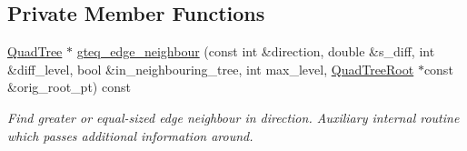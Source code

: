 \subsection*{Private Member Functions}
\begin{DoxyCompactItemize}
\item 
\hyperlink{classoomph_1_1QuadTree}{Quad\+Tree} $\ast$ \hyperlink{classoomph_1_1QuadTree_af2a28294f1e5600481aec008a5bc2327}{gteq\+\_\+edge\+\_\+neighbour} (const int \&direction, double \&s\+\_\+diff, int \&diff\+\_\+level, bool \&in\+\_\+neighbouring\+\_\+tree, int max\+\_\+level, \hyperlink{classoomph_1_1QuadTreeRoot}{Quad\+Tree\+Root} $\ast$const \&orig\+\_\+root\+\_\+pt) const
\begin{DoxyCompactList}\small\item\em Find greater or equal-\/sized edge neighbour in direction. Auxiliary internal routine which passes additional information around. \end{DoxyCompactList}\end{DoxyCompactItemize}

